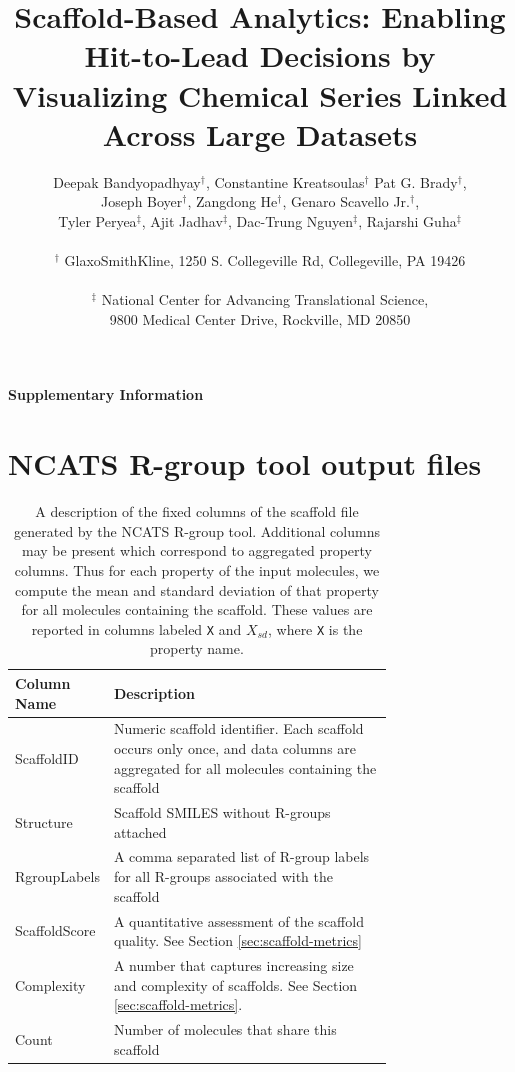 \documentclass[11pt,letterpaper]{article}
\title{Scaffold-Based Analytics: Enabling Hit-to-Lead Decisions by
  Visualizing Chemical Series Linked Across Large Datasets}
\author{Deepak Bandyopadhyay$^{\dagger}$, Constantine Kreatsoulas$^{\dagger}$
  Pat G. Brady$^{\dagger}$, \\
  Joseph Boyer$^{\dagger}$, Zangdong He$^{\dagger}$, 
  Genaro Scavello Jr.$^{\dagger}$,\\
  Tyler Peryea$^{\ddagger}$,
  Ajit Jadhav$^{\ddagger}$,
  Dac-Trung Nguyen$^{\ddagger}$,
  Rajarshi Guha$^{\ddagger}$\\
\\
$^{\dagger}$ GlaxoSmithKline, 1250 S. Collegeville Rd, Collegeville,
PA 19426 \\
\\
$^{\ddagger}$ National Center for Advancing Translational Science, \\
9800 Medical Center Drive, Rockville, MD 20850}
\begin{document}
\begin{center}
  {\huge \textbf{Supplementary Information}}
\end{center}
\begin{minipage}{\textwidth}
   \maketitle
\end{minipage}

\newpage 

\section{NCATS R-group tool output files}
\label{sec:ncats-r-group}

\begin{table}[h]
  \centering
  \begin{tabular}[h]{lp{0.75\linewidth}}
    \hline
    \textbf{Column Name} & \textbf{Description} \\
    \hline
    ScaffoldID & Numeric scaffold identifier. Each scaffold occurs only
    once, and data columns are aggregated for all molecules containing the
    scaffold \\
    Structure & Scaffold SMILES without R-groups attached \\
    RgroupLabels & A comma separated list of R-group labels for
    all R-groups associated with the scaffold \\
    ScaffoldScore & A quantitative assessment of the scaffold quality.
    See Section \ref{sec:scaffold-metrics} \\
    Complexity & A number that captures increasing size and complexity of
    scaffolds. See Section \ref{sec:scaffold-metrics}.  \\
    Count & Number of molecules that share this scaffold \\
    \hline
  \end{tabular}
  \caption{A description of the fixed columns of the scaffold file generated
    by the NCATS R-group tool. Additional columns may be present which
    correspond to aggregated property columns. Thus for each
    property of the input molecules, we compute the mean and standard
    deviation of that property for all molecules containing the
    scaffold. These values are reported in columns labeled \texttt{X} and
    \texttt{$X_{sd}$}, where \texttt{X} is the property name.}
  \label{table:scaffoldfilecolumns}
\end{table}
\end{document}
